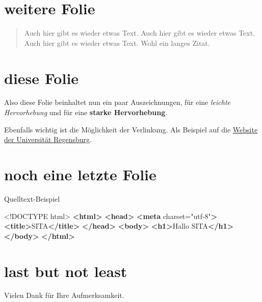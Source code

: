 \documentclass[ngerman,a4,footexclude,headinclude,DIV=9]{scrartcl}
\newenvironment{Shaded}{}{}
\newcommand{\KeywordTok}[1]{\textcolor[rgb]{0.00,0.44,0.13}{\textbf{{#1}}}}
\newcommand{\DataTypeTok}[1]{\textcolor[rgb]{0.56,0.13,0.00}{{#1}}}
\newcommand{\StringTok}[1]{\textcolor[rgb]{0.25,0.44,0.63}{{#1}}}
\newcommand{\OtherTok}[1]{\textcolor[rgb]{0.00,0.44,0.13}{{#1}}}
\newcommand{\NormalTok}[1]{{#1}}
\begin{document}
\section{weitere Folie}\label{weitere-folie}

\begin{quote}
Auch hier gibt es wieder etwas Text. Auch hier gibt es wieder etwas
Text. Auch hier gibt es wieder etwas Text. Wohl ein langes Zitat.
\end{quote}

\section{diese Folie}\label{diese-folie}

Also diese Folie beinhaltet nun ein paar Auszeichnungen, für eine
\emph{leichte Hervorhebung} und für eine \textbf{starke Hervorhebung}.

Ebenfalls wichtig ist die Möglichkeit der Verlinkung. Als Beispiel auf
die \href{http://www.ur.de}{Website der Universität Regensburg}.

\section{noch eine letzte Folie}\label{noch-eine-letzte-folie}

Quelltext-Beispiel

\begin{Shaded}
\begin{Highlighting}[]
\DataTypeTok{<!DOCTYPE }\NormalTok{html}\DataTypeTok{>}
\KeywordTok{<html>}
    \KeywordTok{<head>}
        \KeywordTok{<meta}\OtherTok{ charset=}\StringTok{"utf-8"}\KeywordTok{>}
        \KeywordTok{<title>}\NormalTok{SITA}\KeywordTok{</title>}
    \KeywordTok{</head>}
    \KeywordTok{<body>}
        \KeywordTok{<h1>}\NormalTok{Hallo SITA}\KeywordTok{</h1>}
    \KeywordTok{</body>}
\KeywordTok{</html>}
\end{Highlighting}
\end{Shaded}

\section{last but not least}\label{last-but-not-least}

Vielen Dank für Ihre Aufmerksamkeit.



\clearpage
\thispagestyle{plain}
\markboth{}{}


\printbibheading[heading=bibintoc,title={Quellen}]
\printbibliography[notkeyword=film,title={Literaturverzeichnis}]
\printbibliography[keyword=film,title={Filmverzeichnis}]
\end{document}
